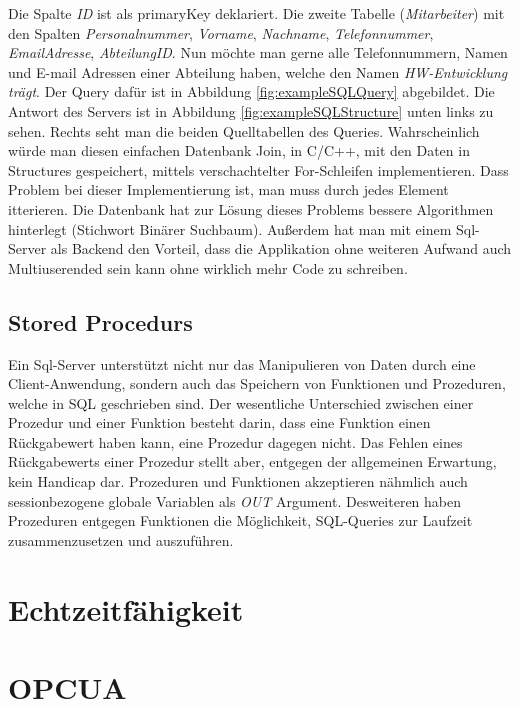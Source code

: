 Die Spalte \emph{ID} ist als primaryKey deklariert.
Die zweite Tabelle (\emph{Mitarbeiter}) mit den Spalten \emph{Personalnummer}, \emph{Vorname}, \emph{Nachname}, \emph{Telefonnummer}, \emph{EmailAdresse}, \emph{AbteilungID}.
Nun möchte man gerne alle Telefonnummern, Namen und E-mail Adressen einer Abteilung haben, welche den Namen \emph{HW-Entwicklung trägt}.
Der Query dafür ist in Abbildung \ref{fig:exampleSQLQuery} abgebildet.
Die Antwort des Servers ist in Abbildung \ref{fig:exampleSQLStructure} unten links zu sehen.
Rechts seht  man die beiden Quelltabellen des Queries.
Wahrscheinlich würde man diesen einfachen Datenbank Join, in C/C++, mit den Daten in Structures gespeichert, mittels verschachtelter For-Schleifen implementieren. Dass Problem bei dieser Implementierung ist, man muss durch jedes Element itterieren.
Die Datenbank hat zur Lösung dieses Problems bessere Algorithmen hinterlegt (Stichwort Binärer Suchbaum).
Außerdem hat man mit einem Sql-Server als Backend den Vorteil, dass die Applikation ohne weiteren Aufwand auch Multiuserended sein kann ohne wirklich mehr Code zu schreiben.
\subsection{Stored Procedurs}\label{subsec:storedProc}
Ein Sql-Server unterstützt nicht nur das Manipulieren von Daten durch eine Client-Anwendung, sondern auch das Speichern von Funktionen und Prozeduren, welche in SQL geschrieben sind.
Der wesentliche Unterschied zwischen einer Prozedur und einer Funktion besteht darin, dass eine Funktion einen Rückgabewert haben kann, eine Prozedur dagegen nicht.
Das Fehlen eines Rückgabewerts einer Prozedur stellt aber, entgegen der allgemeinen Erwartung, kein Handicap dar. Prozeduren und Funktionen akzeptieren nähmlich auch sessionbezogene globale Variablen als \emph{OUT} Argument. 
Desweiteren haben Prozeduren entgegen Funktionen die Möglichkeit, SQL-Queries zur Laufzeit zusammenzusetzen und auszuführen.

\section{Echtzeitfähigkeit}
\section{OPCUA}
